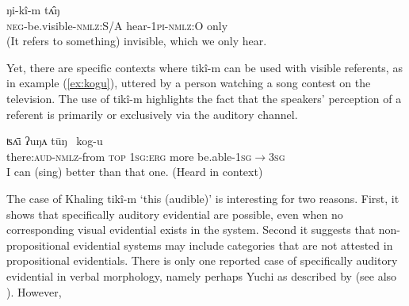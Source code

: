 \documentclass[oneside,a4paper,11pt]{article}
\newcommand{\ipa}[1]{{\phon \mbox{#1}}} %
\begin{document}
\begin{exe}
\ex \label{ex:def}
\gll  	 	 \ipa{mu-toɔç-pɛ,} \ipa{ŋi-kî-m} \ipa{tʌ̂ŋ}   \\
\textsc{neg}-be.visible-\textsc{nmlz:S/A} hear-\textsc{1pi-nmlz:O} only  \\
\glt (It refers to something) invisible, which we only hear.
\end{exe}

Yet, there are specific contexts where \ipa{tikî-m}  can be used with visible referents, as in example  (\ref{ex:kogu}), uttered by a person watching a song contest on the television. The use of \ipa{tikî-m} highlights the  fact that the  speakers' perception of a referent is primarily or exclusively via the auditory channel.

\begin{exe}
\ex \label{ex:kogu}
\gll  	\ipa{tikî-m-kʌ}   	\ipa{ʦʌ̄i} \ipa{ʔuŋʌ} \ipa{tūŋ }   	\ipa{kog-u}   \\
there:\textsc{aud}-\textsc{nmlz}-from \textsc{top} \textsc{1sg:erg} more be.able-\textsc{1sg$\rightarrow$3sg}	  \\
\glt I can (sing) better than that one. (Heard in context)
\end{exe}

 The case of Khaling \ipa{tikî-m} `this (audible)' is interesting for two reasons. First, it shows that specifically auditory evidential are possible, even when no corresponding visual evidential exists in the system.  Second it suggests that non-propositional evidential systems may include categories that are not attested in propositional evidentials. There is only one reported case of specifically auditory evidential in verbal morphology, namely perhaps Yuchi as described by \citet{linn01euchee} (see also \citealt[37]{aikhenvald06}). However, 
\citet{wagner38yuchi} 


\begin{table}[H]
\caption{Non-propositional evidential systems with non-visual sensory evidentials } \label{tab:attested}
\end{table}	
 
\end{document}
